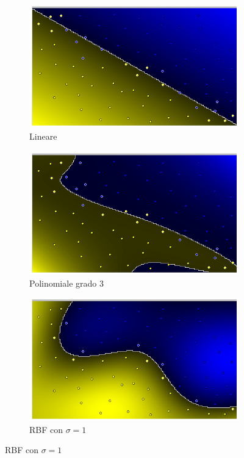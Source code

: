 \documentclass[a4paper,oneside,titlepage]{book}
\begin{document}
\begin{figure}[htp]
	\begin{subfigure}{0.3\textwidth}
        \centering
        \includegraphics[width=\textwidth, height=\textheight, keepaspectratio]{kernel1.png}
        \caption{Lineare}
    \end{subfigure}
    \hfill
    \begin{subfigure}{0.3\textwidth}
        \centering
        \includegraphics[width=\textwidth, height=\textheight, keepaspectratio]{kernel2.png}
        \caption{Polinomiale grado 3}
    \end{subfigure}
    \hfill
    \begin{subfigure}{0.3\textwidth}
        \centering
        \includegraphics[width=\textwidth, height=\textheight, keepaspectratio]{kernel3.png}
        \caption{RBF con $\sigma=1$}
    \end{subfigure}
\end{figure}
\end{document}
